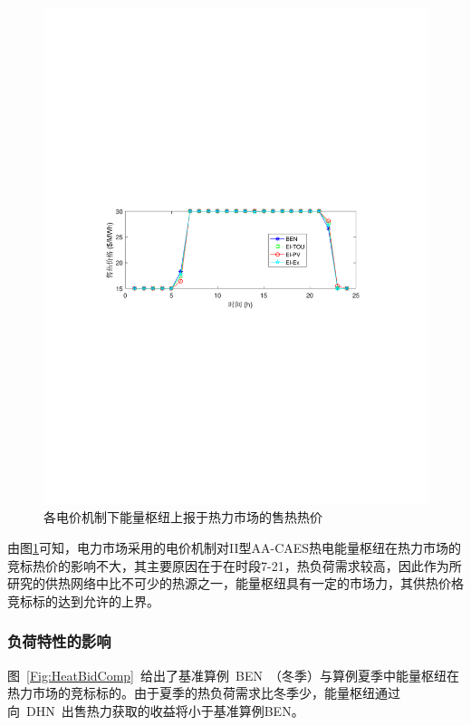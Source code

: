 \begin{figure}[!htp]
\centering
\includegraphics[scale=0.75]{figures/Chap4-11-HeatPriceElPrice.pdf}
\caption{各电价机制下能量枢纽上报于热力市场的售热热价}
\label{Fig:HeatPriceElPrice}
\end{figure}

由图\ref{Fig:HeatPriceElPrice}可知，电力市场采用的电价机制对II型AA-CAES热电能量枢纽在热力市场的竞标热价的影响不大，其主要原因在于在时段7-21，热负荷需求较高，因此作为所研究的供热网络中比不可少的热源之一，能量枢纽具有一定的市场力，其供热价格竞标标的达到允许的上界。

\subsubsection{负荷特性的影响}
图~\ref{Fig:HeatBidComp}~给出了基准算例~BEN~（冬季）与算例夏季中能量枢纽在热力市场的竞标标的。由于夏季的热负荷需求比冬季少，能量枢纽通过向~DHN~出售热力获取的收益将小于基准算例BEN。


